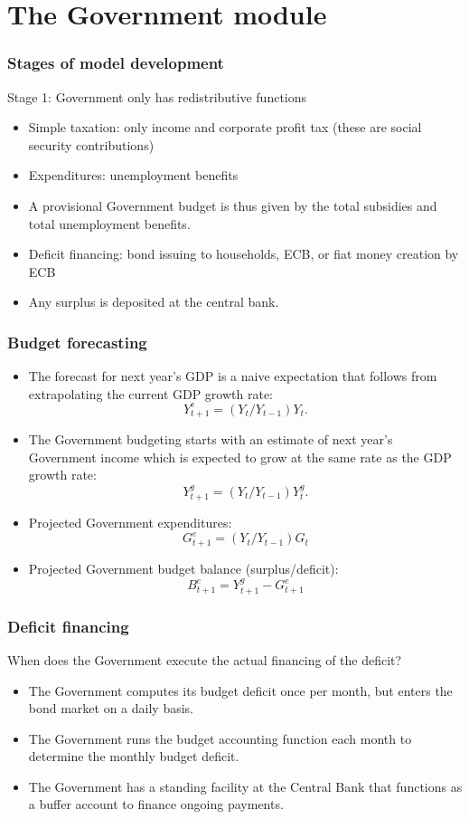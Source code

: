 \documentclass{beamer}
\begin{document}
\section{The Government module}
\begin{frame}{}
\frametitle{Stages of model development}
Stage 1: Government only has redistributive functions
\begin{itemize}
\item Simple taxation: only income and corporate profit tax (these are social security contributions)
\item Expenditures: unemployment benefits
\item A provisional Government budget is thus given by the total subsidies and total unemployment benefits.
\item Deficit financing: bond issuing to households, ECB, or fiat money creation by ECB
\item Any surplus is deposited at the central bank.
\end{itemize}
\end{frame}

\begin{frame}{}
\frametitle{Budget forecasting}
\begin{itemize}
\item The forecast for next year's GDP is a naive expectation that follows from extrapolating the current GDP growth rate:
\begin{equation}
Y^e_{t+1} = (Y_t/Y_{t-1}) Y_t.
\end{equation}
\item The Government budgeting starts with an estimate of next year's Government income which is expected to grow at the same rate as the GDP growth rate:
\begin{equation}
Y^g_{t+1} = (Y_t/Y_{t-1})Y^g_{t}.
\end{equation}
\item Projected Government expenditures:
	\begin{equation}
		G^e_{t+1} = (Y_t/Y_{t-1})G_t
	\end{equation}
	\item Projected Government budget balance (surplus/deficit):
	\begin{equation}
		B^e_{t+1} = Y^g_{t+1} - G^e_{t+1}
	\end{equation}
\end{itemize}
\end{frame}


\begin{frame}{}
\frametitle{Deficit financing}
When does the Government execute the actual financing of the deficit?
\begin{itemize}
\item The Government computes its budget deficit once per month, but enters the bond market on a daily basis.
\item The Government runs the budget accounting function each month to determine the monthly budget deficit.
\item The Government has a standing facility at the Central Bank that functions as a buffer account to finance ongoing payments.
\end{itemize}
\end{frame}
\end{document}
